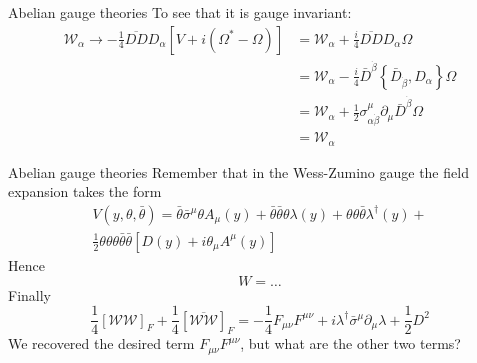 \documentclass[10pt]{beamer}
\begin{document}
\begin{frame}{Abelian gauge theories}
To see that it is gauge invariant:
\begin{equation*}
\begin{aligned}
    \mathcal{W}_{\alpha} \rightarrow-\frac{1}{4} \overline{D D} D_{\alpha}\left[V+i\left(\Omega^{*}-\Omega\right)\right] &=\mathcal{W}_{\alpha}+\frac{i}{4} \overline{D D} D_{\alpha} \Omega \\
    &=\mathcal{W}_{\alpha}-\frac{i}{4} \bar{D}^{\dot{\beta}}\left\{\bar{D}_{\dot{\beta}}, D_{\alpha}\right\} \Omega \\
    &=\mathcal{W}_{\alpha}+\frac{1}{2} \sigma_{\alpha \dot{\beta}}^{\mu} \partial_{\mu} \bar{D}^{\dot{\beta}} \Omega \\
    &=\mathcal{W}_{\alpha}
\end{aligned}
\end{equation*}
\end{frame}

\begin{frame}{Abelian gauge theories}
Remember that in the Wess-Zumino gauge the field expansion takes the form 
\begin{gather*}
    V(y, \theta, \bar \theta) = \bar\theta \bar{\sigma}^{\mu} \theta A_{\mu}(y)+\bar\theta \bar\theta \theta \lambda(y)+\theta \theta \bar\theta \lambda^{\dagger}(y) + \\ 
    \frac{1}{2} \theta \theta \theta \bar\theta \bar\theta\left[D(y)+i \theta_{\mu} A^{\mu}(y)\right]
\end{gather*}
Hence 
\begin{equation*}
    W = \dots
\end{equation*}
Finally 
\begin{equation*}
    \frac{1}{4}\left[\mathcal{WW}\right]_F + \frac{1}{4} \left[\overline{\mathcal{WW}}\right]_F = -\frac{1}{4} F_{\mu\nu} F^{\mu\nu} + i \lambda^{\dagger} \bar\sigma^{\mu} \partial_{\mu} \lambda + \frac{1}{2} D^2
\end{equation*}
We recovered the desired term $F_{\mu\nu}F^{\mu\nu}$, but what are the other two terms?
\end{frame}
\end{document}
